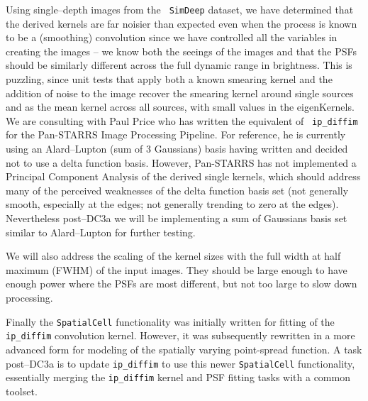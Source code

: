 Using single--depth images from the {\tt
SimDeep} dataset, we have determined that the derived kernels are far
noisier than expected even when the process is known to be a
(smoothing) convolution since we have controlled all the variables in
creating the images -- we know both the seeings of the images and that
the PSFs should be similarly different across the full dynamic range
in brightness.  This is puzzling, since unit tests that apply both a
known smearing kernel and the addition of noise to the image recover
the smearing kernel around single sources and as the mean kernel
across all sources, with small values in the eigenKernels.  We are
consulting with Paul Price who has written the equivalent of {\tt
ip\_diffim} for the Pan-STARRS Image Processing Pipeline.  For
reference, he is currently using an Alard--Lupton (sum of 3 Gaussians)
basis having written and decided not to use a delta function basis.
However, Pan-STARRS has not implemented a Principal Component Analysis
of the derived single kernels, which should address many of the
perceived weaknesses of the delta function basis set (not generally
smooth, especially at the edges; not generally trending to zero at the
edges).  Nevertheless post--DC3a we will be implementing a sum of
Gaussians basis set similar to Alard--Lupton for further testing.

We will also address the scaling of the kernel sizes with the full
width at half maximum (FWHM) of the input images.  They should be
large enough to have enough power where the PSFs are most different,
but not too large to slow down processing.

Finally the {\tt SpatialCell} functionality was initially written for
fitting of the {\tt ip\_diffim} convolution kernel.  However, it was
subsequently rewritten in a more advanced form for modeling of the
spatially varying point-spread function.  A task post--DC3a is to
update {\tt ip\_diffim} to use this newer {\tt SpatialCell} functionality,
essentially merging the {\tt ip\_diffim} kernel and PSF fitting tasks
with a common toolset.

